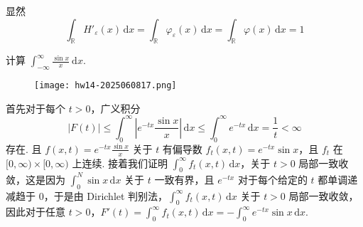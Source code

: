 显然
\[
\int_{\mathbb{R}}^{} H'_{\varepsilon} (x)\, \mathrm{d}x =\int_{\mathbb{R}}^{} \varphi_{\varepsilon}(x) \, \mathrm{d}x =\int_{\mathbb{R}}^{} \varphi(x) \, \mathrm{d}x =1
\]
\begin{exercise}
计算 $\int_{-\infty}^{\infty} \frac{\sin x}{x} \mathrm{~d} x$.
\end{exercise}
\begin{figure}[H]
\centering
\texttt{[image: hw14-2025060817.png]}
\label{}
\end{figure}

首先对于每个 $t>0$，广义积分
\[
\lvert F(t) \rvert \leq \int_{0}^{\infty} \left\lvert  e^{ -tx }\frac{\sin x}{x}  \right\rvert  \, \mathrm{d}x \leq \int_{0}^{\infty} e^{ -tx } \, \mathrm{d}x =\frac{1}{t}<\infty
\]
存在. 且 $f(x,t)=e^{ -tx }\frac{\sin x}{x}$ 关于 $t$ 有偏导数 $f_{t}(x,t)=e^{ -tx }\sin x$，且 $f_{t}$ 在 $[0,\infty)\times[0,\infty)$ 上连续. 接着我们证明 $\int_{0}^{\infty} f_{t}(x,t)\, \mathrm{d}x$，关于 $t>0$ 局部一致收敛，这是因为 $\int_{0}^{N} \sin x \, \mathrm{d}x$ 关于 $t$ 一致有界，且 $e^{ -tx }$ 对于每个给定的 $t$ 都单调递减趋于 0，于是由 Dirichlet 判别法，$\int_{0}^{\infty} f_{t}(x,t) \, \mathrm{d}x$ 关于 $t>0$ 局部一致收敛，因此对于任意 $t>0$，$F'(t)=\int_{0}^{\infty } f_{t}(x,t) \, \mathrm{d}x=-\int_{0}^{\infty} e^{ -tx }\sin x \, \mathrm{d}x$.
